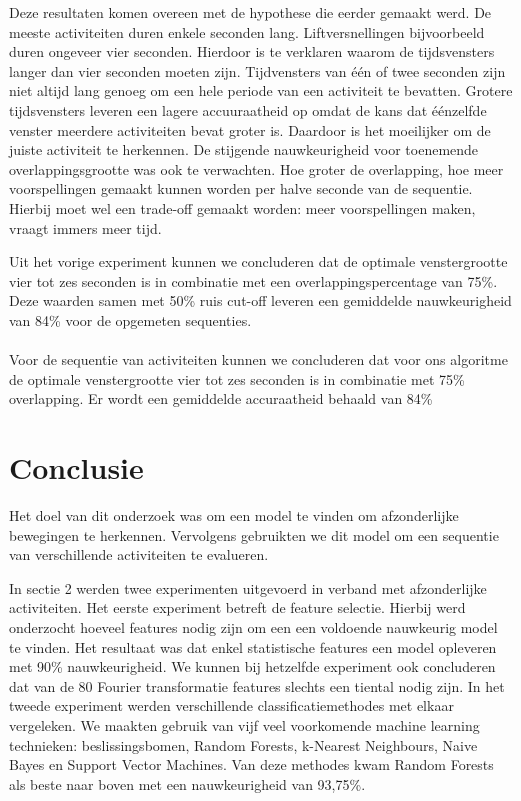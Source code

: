 \documentclass{article}
\begin{document}
Deze resultaten komen overeen met de hypothese die eerder gemaakt werd. De meeste activiteiten duren enkele seconden lang. Liftversnellingen bijvoorbeeld duren ongeveer vier seconden. Hierdoor is te verklaren waarom de tijdsvensters langer dan vier seconden moeten zijn. Tijdvensters van \'e\'en of twee seconden zijn niet altijd lang genoeg om een hele periode van een activiteit te bevatten. Grotere tijdsvensters leveren een lagere accuuraatheid op omdat de kans dat \'e\'enzelfde venster meerdere activiteiten bevat groter is. Daardoor is het moeilijker om de juiste activiteit te herkennen. De stijgende nauwkeurigheid voor toenemende overlappingsgrootte was ook te verwachten. Hoe groter de overlapping, hoe meer voorspellingen gemaakt kunnen worden per halve seconde van de sequentie. Hierbij moet wel een trade-off gemaakt worden: meer voorspellingen maken, vraagt immers meer tijd.

Uit het vorige experiment kunnen we concluderen dat de optimale venstergrootte vier tot zes seconden is in combinatie met een overlappingspercentage van 75\%. Deze waarden samen met 50\% ruis cut-off leveren een gemiddelde nauwkeurigheid van 84\% voor de opgemeten sequenties.
\\~\\

Voor de sequentie van activiteiten kunnen we concluderen dat voor ons algoritme de optimale venstergrootte vier tot zes seconden is in combinatie met 75\% overlapping. Er wordt een gemiddelde accuraatheid behaald van 84\%

	

\section{Conclusie}

Het doel van dit onderzoek was om een model te vinden om afzonderlijke bewegingen te herkennen. Vervolgens gebruikten we dit model om een sequentie van verschillende activiteiten te evalueren.

	In sectie 2 werden twee experimenten uitgevoerd in verband met afzonderlijke activiteiten. Het eerste experiment betreft de feature selectie. Hierbij werd onderzocht hoeveel features nodig zijn om een een voldoende nauwkeurig model te vinden. Het resultaat was dat enkel statistische features een model opleveren met 90\% nauwkeurigheid. We kunnen bij hetzelfde experiment ook concluderen dat van de 80 Fourier transformatie features slechts een tiental nodig zijn.
	In het tweede experiment werden verschillende classificatiemethodes met elkaar vergeleken. We maakten gebruik van vijf veel voorkomende machine learning technieken: beslissingsbomen, Random Forests, k-Nearest Neighbours, Naive Bayes en Support Vector Machines. Van deze methodes kwam Random Forests als beste naar boven met een nauwkeurigheid van 93,75\%.
	
\end{document}
